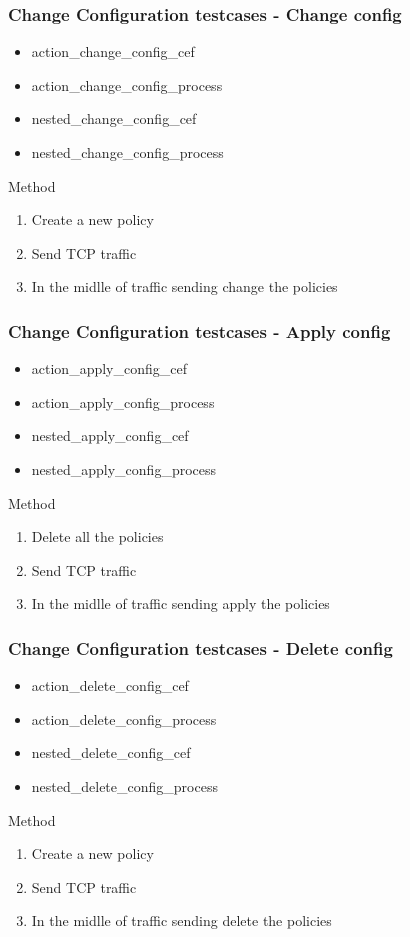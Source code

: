 \documentclass{beamer}
\begin{document}
\begin{frame}[fragile] \frametitle{Change Configuration testcases - Change config}
\begin{itemize}
    \item action\_change\_config\_cef
    \item action\_change\_config\_process
    \item nested\_change\_config\_cef
    \item nested\_change\_config\_process
\end{itemize}
\begin{block}{Method}
\begin{enumerate}
    \item Create a new policy
    \item Send TCP traffic
    \item In the midlle of traffic sending change the policies
\end{enumerate}
\end{block}
\end{frame}

\begin{frame}[fragile] \frametitle{Change Configuration testcases - Apply config}
\begin{itemize}
    \item action\_apply\_config\_cef
    \item action\_apply\_config\_process
    \item nested\_apply\_config\_cef
    \item nested\_apply\_config\_process
\end{itemize}
\begin{block}{Method}
\begin{enumerate}
    \item Delete all the policies
    \item Send TCP traffic
    \item In the midlle of traffic sending apply the policies
\end{enumerate}
\end{block}
\end{frame}

\begin{frame}[fragile] \frametitle{Change Configuration testcases - Delete config}
\begin{itemize}
    \item action\_delete\_config\_cef
    \item action\_delete\_config\_process
    \item nested\_delete\_config\_cef
    \item nested\_delete\_config\_process
\end{itemize}
\begin{block}{Method}
\begin{enumerate}
    \item Create a new policy
    \item Send TCP traffic
    \item In the midlle of traffic sending delete the policies
\end{enumerate}
\end{block}
\end{frame}
\end{document}
